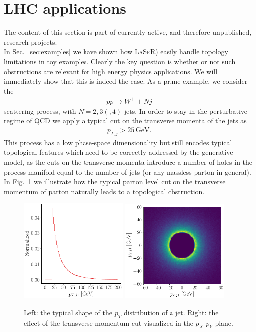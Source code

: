 \section{LHC applications}\label{sec:LHCexamples}
The content of this section is part of currently active, and therefore unpublished, research projects.\\
In Sec.~\ref{sec:examples} we have shown how \textsc{LaSeR}) easily handle topology limitations in toy examples. Clearly the key question is whether or not such obstructions are relevant for high energy physics applications.
We will immediately show that this is indeed the case.
As a prime example, we consider the 
\begin{align}
     p p \to W^+ + Nj
\end{align}
scattering process, with $N = 2, 3 (, 4)$ jets. In order to stay in the perturbative regime of QCD we apply a typical cut on the transverse momenta of the jets as
\begin{align}
    p_{T,j}>25\,\mathrm{GeV}.
\end{align}
This process has a low phase-space dimensionality but still encodes typical topological features which need to be correctly addressed by the generative model, as the cuts on the transverse momenta introduce a number of holes in the process manifold equal to the number of jets (or any massless parton in general). In Fig.~\ref{fig:lhc_hole} we illustrate how the typical parton level cut on the transverse momentum of parton naturally leads to a topological obstruction.
%
\begin{figure}[H]
\centering
\includegraphics[width=0.47\textwidth, page=1]{./figures/pt_ring.pdf}
\includegraphics[width=0.47\textwidth, page=1]{./figures/ring.pdf}
\caption{Left: the typical shape of the $p_T$ distribution of a jet. Right: the effect of the transverse momentum cut visualized in the $p_X$-$p_Y$ plane.}
\label{fig:lhc_hole}
\end{figure}
